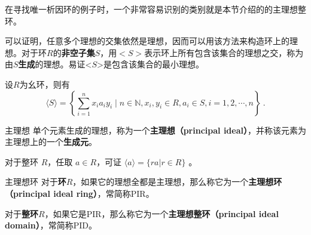 

在寻找唯一析因环的例子时，一个非常容易识别的类别就是本节介绍的的主理想整环。

可以证明，任意多个理想的交集依然是理想，因而可以用该方法来构造环上的理想。对于环$R$的\textbf{非空子集}$S$，用$<S>$表示环上所有包含该集合的理想之交，称为由$S$\textbf{生成}的理想。易证<$S$>是包含该集合的最小理想。
\begin{example}{}
设$R$为幺环，则有
\begin{equation}
\langle S\rangle=\left\{\sum_{i=1}^n x_i a_iy_i \mid n \in \mathbb{N}, x_i,y_i \in R, a_i \in S, i=1,2, \cdots, n\right\}~.
\end{equation}
\end{example}
\begin{definition}{主理想}
单个元素生成的理想，称为一个\textbf{主理想（principal ideal）}，并称该元素为主理想上的一个\textbf{生成元}。

对于整环 $R$，任取 $a\in R$，可证 $\langle a \rangle=\{ra|r\in R\}$ 。
\end{definition}

\begin{definition}{主理想环}
对于\textbf{环}$R$，如果它的理想全都是主理想，那么称它为一个\textbf{主理想环（principal ideal ring）}，常简称PIR。

对于\textbf{整环}$R$，如果它是PIR，那么称它为一个\textbf{主理想整环（principal ideal domain）}，常简称PID。
\end{definition}







